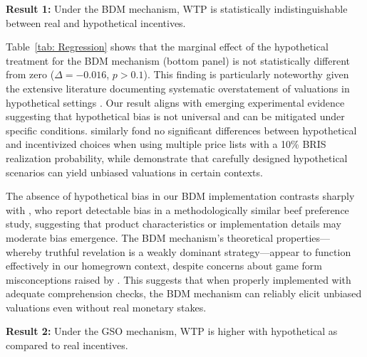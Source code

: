 \documentclass[12pt]{article}
\begin{document}

\textbf{Result 1:} Under the BDM mechanism, WTP is statistically indistinguishable between real and hypothetical incentives.

Table~\ref{tab: Regression} shows that the marginal effect of the hypothetical treatment for the BDM mechanism (bottom panel) is not statistically different from zero (\(\Delta = -0.016\), \(p > 0.1\)). This finding is particularly noteworthy given the extensive literature documenting systematic overstatement of valuations in hypothetical settings \citep{penn2018understanding, loomis_whats_2011}.
Our result aligns with emerging experimental evidence suggesting that hypothetical bias is not universal and can be mitigated under specific conditions. \citet{branas-garza_paid_2023} similarly fond no significant differences between hypothetical and incentivized choices when using multiple price lists with a 10\% BRIS realization probability, while \citet{drichoutis_incentives_2025} demonstrate that carefully designed hypothetical scenarios can yield unbiased valuations in certain contexts.

The absence of hypothetical bias in our BDM implementation contrasts sharply with \citet{ahles_testing_2024}, who report detectable bias in a methodologically similar beef preference study, suggesting that product characteristics or implementation details may moderate bias emergence.
 The BDM mechanism's theoretical properties—whereby truthful revelation is a weakly dominant strategy—appear to function effectively in our homegrown context, despite concerns about game form misconceptions raised by \citet{cason_misconceptions_2014}. This suggests that when properly implemented with adequate comprehension checks, the BDM mechanism can reliably elicit unbiased valuations even without real monetary stakes.



 
\vspace{0.5cm}


\textbf{Result 2:} Under the GSO mechanism, WTP is higher with hypothetical as compared to real incentives. 
\end{document}
